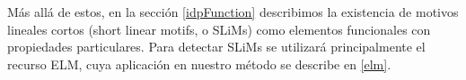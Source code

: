 



Más allá de estos, en la sección \ref{idpFunction} describimos la existencia de motivos lineales cortos (short linear motifs, o SLiMs) como elementos funcionales con propiedades particulares.  
Para detectar SLiMs se utilizará principalmente el recurso ELM, cuya aplicación en nuestro método se describe en \ref{elm}.

